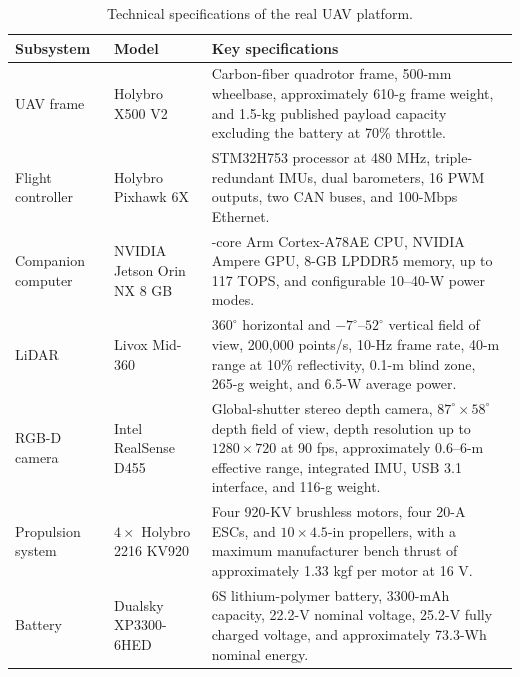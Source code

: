 
\begin{table}[!t]
    \centering
    \caption{Technical specifications of the real UAV platform.}
    \label{tab:real_uav_hardware}
    \footnotesize
    \setlength{\tabcolsep}{5pt}
    \renewcommand{\arraystretch}{1.15}

    \begin{tabularx}{\textwidth}{
        @{}
        >{\raggedright\arraybackslash}p{2.3cm}
        >{\raggedright\arraybackslash}p{3.2cm}
        >{\raggedright\arraybackslash}X
        @{}
    }
        \toprule
        \textbf{Subsystem} &
        \textbf{Model} &
        \textbf{Key specifications} \\
        \midrule

        UAV frame &
        Holybro X500 V2 &
        Carbon-fiber quadrotor frame, 500-mm wheelbase,
        approximately 610-g frame weight, and 1.5-kg published
        payload capacity excluding the battery at 70\% throttle. \\

        Flight controller &
        Holybro Pixhawk 6X &
        STM32H753 processor at 480 MHz, triple-redundant IMUs,
        dual barometers, 16 PWM outputs, two CAN buses,
        and 100-Mbps Ethernet. \\

        Companion computer &
        NVIDIA Jetson Orin NX 8 GB &
        6-core Arm Cortex-A78AE CPU, NVIDIA Ampere GPU,
        8-GB LPDDR5 memory, up to 117 TOPS,
        and configurable 10--40-W power modes. \\

        LiDAR &
        Livox Mid-360 &
        $360^{\circ}$ horizontal and $-7^{\circ}$--$52^{\circ}$
        vertical field of view, 200,000 points/s, 10-Hz frame rate,
        40-m range at 10\% reflectivity, 0.1-m blind zone,
        265-g weight, and 6.5-W average power. \\

        RGB-D camera &
        Intel RealSense D455 &
        Global-shutter stereo depth camera,
        $87^{\circ}\times58^{\circ}$ depth field of view,
        depth resolution up to $1280\times720$ at 90 fps,
        approximately 0.6--6-m effective range,
        integrated IMU, USB 3.1 interface, and 116-g weight. \\

        Propulsion system &
        $4\times$ Holybro 2216 KV920 &
        Four 920-KV brushless motors, four 20-A ESCs,
        and $10\times4.5$-in propellers, with a maximum
        manufacturer bench thrust of approximately
        1.33 kgf per motor at 16 V. \\

        Battery &
        Dualsky XP3300-6HED &
        6S lithium-polymer battery, 3300-mAh capacity,
        22.2-V nominal voltage, 25.2-V fully charged voltage,
        and approximately 73.3-Wh nominal energy. \\

        \bottomrule
    \end{tabularx}
\end{table}
